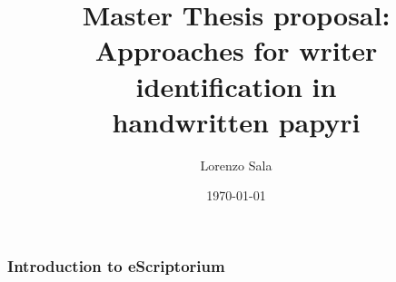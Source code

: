\documentclass{beamer}
\title[Writer identification task]{Master Thesis proposal:\\Approaches for writer identification in \\
handwritten papyri}
\author{Lorenzo Sala}
\date{\today}
\institute{Stochastics and Data Science}
\begin{document}
\begin{frame}[plain]
    \maketitle
\end{frame}
\begin{frame}
	\frametitle{Introduction to eScriptorium}
	
\end{frame}
\end{document}
